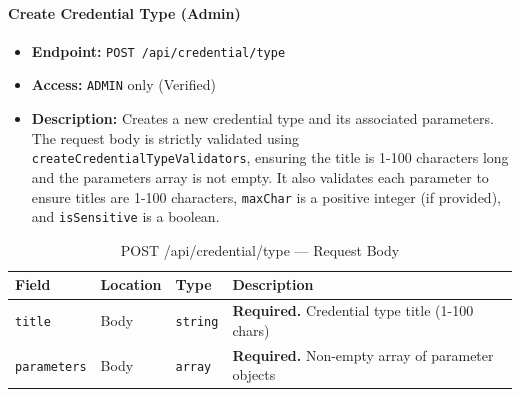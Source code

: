 \paragraph{Create Credential Type (Admin)}
\label{subsubsec:create-credential-type}

\begin{itemize}
  \item \textbf{Endpoint:} \texttt{POST /api/credential/type}
  \item \textbf{Access:} \texttt{ADMIN} only (Verified)
  \item \textbf{Description:} Creates a new credential type and its associated parameters.
  The request body is strictly validated using \texttt{createCredentialTypeValidators}, ensuring the title is 1-100 characters long and the parameters array is not empty. It also validates each parameter to ensure titles are 1-100 characters, \texttt{maxChar} is a positive integer (if provided), and \texttt{isSensitive} is a boolean.
\end{itemize}

\begin{table}[H]
\centering
\renewcommand{\arraystretch}{1.3}
\begin{tabularx}{\textwidth}{|l|l|l|X|}
\hline
\textbf{Field} & \textbf{Location} & \textbf{Type} & \textbf{Description} \\
\hline
\texttt{title}       & Body & \texttt{string} & \textbf{Required.} Credential type title (1-100 chars) \\
\hline
\texttt{parameters}  & Body & \texttt{array}  & \textbf{Required.} Non-empty array of parameter objects \\
\hline
\end{tabularx}
\caption{POST /api/credential/type — Request Body}
\label{tab:create-credential-type-body}
\end{table}

